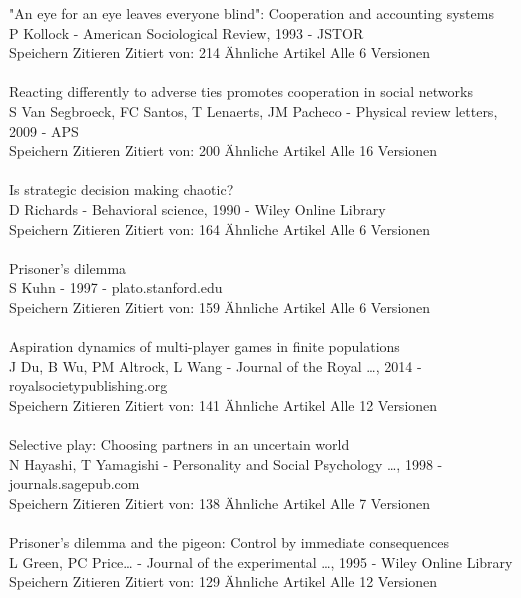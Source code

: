 \documentclass[11pt]{article}
\begin{document}
\noindent 
"An eye for an eye leaves everyone blind": Cooperation and accounting systems\\
P Kollock - American Sociological Review, 1993 - JSTOR\\
Speichern Zitieren Zitiert von: 214 Ähnliche Artikel Alle 6 Versionen\\
\\
\noindent 
Reacting differently to adverse ties promotes cooperation in social networks\\
S Van Segbroeck, FC Santos, T Lenaerts, JM Pacheco - Physical review letters, 2009 - APS\\
Speichern Zitieren Zitiert von: 200 Ähnliche Artikel Alle 16 Versionen\\
\\
\noindent 
Is strategic decision making chaotic?\\
D Richards - Behavioral science, 1990 - Wiley Online Library\\
Speichern Zitieren Zitiert von: 164 Ähnliche Artikel Alle 6 Versionen\\
\\
\noindent 
[HTML] Prisoner's dilemma\\
S Kuhn - 1997 - plato.stanford.edu\\
Speichern Zitieren Zitiert von: 159 Ähnliche Artikel Alle 6 Versionen\\
\\
\noindent 
Aspiration dynamics of multi-player games in finite populations\\
J Du, B Wu, PM Altrock, L Wang - Journal of the Royal …, 2014 - royalsocietypublishing.org\\
Speichern Zitieren Zitiert von: 141 Ähnliche Artikel Alle 12 Versionen\\
\\
\noindent 
Selective play: Choosing partners in an uncertain world\\
N Hayashi, T Yamagishi - Personality and Social Psychology …, 1998 - journals.sagepub.com\\
Speichern Zitieren Zitiert von: 138 Ähnliche Artikel Alle 7 Versionen\\
\\
\noindent 
Prisoner's dilemma and the pigeon: Control by immediate consequences\\
L Green, PC Price… - Journal of the experimental …, 1995 - Wiley Online Library\\
Speichern Zitieren Zitiert von: 129 Ähnliche Artikel Alle 12 Versionen\\
\end{document}
